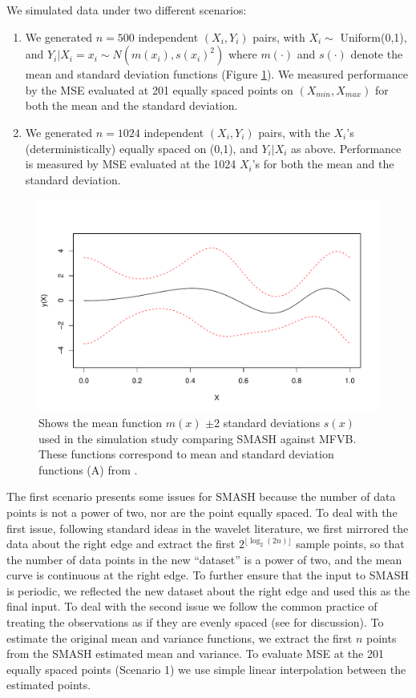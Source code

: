\documentclass[12pt]{article}
\begin{document}
We simulated data under two different scenarios:
\begin{enumerate}
\item We generated $n=500$ independent $(X_i,Y_i)$ pairs, with $X_i \sim$ Uniform(0,1), and $Y_i | X_i=x_i \sim N(m(x_i),s(x_i)^2)$
where $m(\cdot)$ and $s(\cdot)$ denote the mean and standard deviation functions (Figure \ref{fig:mfvb_eg}). We measured performance by the MSE 
evaluated at 201 equally spaced points on $(X_{min},X_{max})$ for both the mean and the standard deviation.
\item We generated $n=1024$ independent $(X_i,Y_i)$ pairs, with the $X_i$'s (deterministically) equally spaced on (0,1), and $Y_i|X_i$ as above. Performance is measured by MSE evaluated at the 1024 $X_i$'s for both the mean and the standard deviation.
\end{enumerate}
\begin{figure}[ht]
    \centering
    \includegraphics[width=\textwidth]{mfvb_eg.pdf}
    \caption{Shows the mean function $m(x)$ $\pm$2 standard deviations $s(x)$ used in the simulation study comparing SMASH against MFVB. These functions correspond to mean and standard deviation functions (A) from \cite{Menictas2015Variational}.}
    \label{fig:mfvb_eg}
\end{figure}

The first scenario presents some issues for SMASH because the number of data points is not a power of two, nor are the point equally spaced. To deal with the first issue, following standard ideas in the wavelet literature, we first mirrored the data about the right edge and extract the first $2^{\lfloor\log_2(2n)\rfloor}$ sample points, so that the number of data points in the new ``dataset'' is a power of two, and the mean curve is continuous at the right edge. To further ensure that the input to SMASH is periodic, we reflected the new dataset about the right edge and used this as the final input. 
To deal with the second issue we follow the common practice of treating the observations as if they are evenly spaced (see \cite{Sardy1999Wavelet} for discussion). To estimate the original mean and variance functions, we extract the first $n$ points from the SMASH estimated mean and variance. 
To evaluate MSE at the 201 equally spaced points (Scenario 1) we use simple linear interpolation between the estimated points. 
\end{document}
